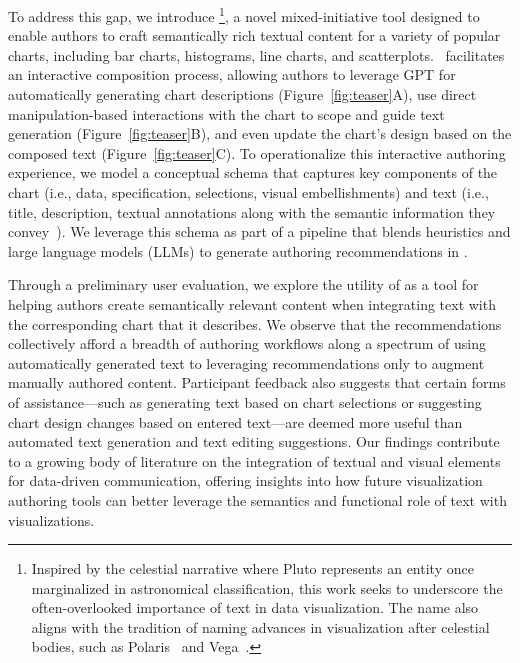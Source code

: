 To address this gap, we introduce \pluto\footnote{Inspired by the celestial narrative where Pluto represents an entity once marginalized in astronomical classification, this work seeks to underscore the often-overlooked importance of text in data visualization. The name also aligns with the tradition of naming advances in visualization after celestial bodies, such as Polaris~\cite{polaris} and Vega~\cite{vega2014visualization}.}, a novel mixed-initiative tool designed to enable authors to craft semantically rich textual content for a variety of popular charts, including bar charts, histograms, line charts, and scatterplots.
\pluto~facilitates an interactive composition process, allowing authors to leverage GPT for automatically generating chart descriptions (Figure~\ref{fig:teaser}A), use direct manipulation-based interactions with the chart to scope and guide text generation (Figure~\ref{fig:teaser}B), and even update the chart's design based on the composed text (Figure~\ref{fig:teaser}C). To operationalize this interactive authoring experience, we model a conceptual schema that captures key components of the chart (i.e., data, specification, selections, visual embellishments) and text (i.e., title, description, textual annotations along with the semantic information they convey~\cite{lundgard2021accessible}).
We leverage this schema as part of a pipeline that blends heuristics and large language models (LLMs) to generate authoring recommendations in \pluto. 


Through a preliminary user evaluation, we explore the utility of \pluto{} as a tool for helping authors create semantically relevant content when integrating text with the corresponding chart that it describes. We observe that the recommendations collectively afford a breadth of authoring workflows along a spectrum of using automatically generated text to leveraging recommendations only to augment manually authored content. Participant feedback also suggests that certain forms of assistance---such as generating text based on chart selections or suggesting chart design changes based on entered text---are deemed more useful than automated text generation and text editing suggestions. Our findings contribute to a growing body of literature on the integration of textual and visual elements for data-driven communication, offering insights into how future visualization authoring tools can better leverage the semantics and functional role of text with visualizations.